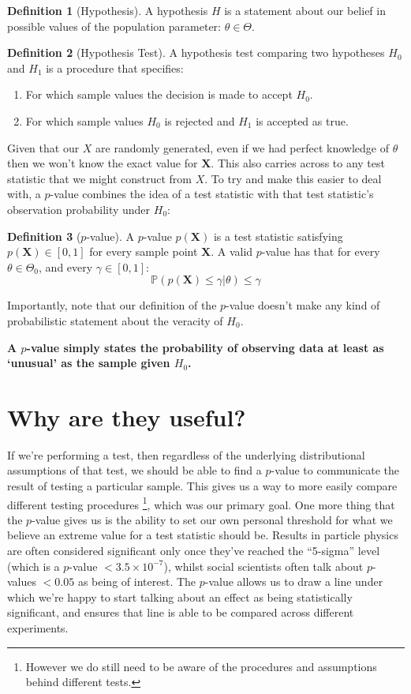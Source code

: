 \documentclass{tufte-handout}
\theoremstyle{plain}
\theoremstyle{definition}
\newtheorem{dfn}{Definition}
\newcommand{\XX}{\mathbf{X}}
\newcommand{\prb}[1]{\mathbb{P}\left( #1 \right)}
\begin{document}
\begin{dfn}[Hypothesis]
    A hypothesis $H$ is a statement about our belief in possible values of the population parameter: $\theta \in \Theta$.
\end{dfn}

\begin{dfn}[Hypothesis Test]
    A hypothesis test comparing two hypotheses $H_0$ and $H_1$ is a procedure that specifies:
    \begin{enumerate}
        \item For which sample values the decision is made to accept $H_0$.
        \item For which sample values $H_0$ is rejected and $H_1$ is accepted as true.
    \end{enumerate}
\end{dfn}

Given that our $X$ are randomly generated, even if we had perfect knowledge of $\theta$ then we won't know the exact value for $\mathbf{X}$.
This also carries across to any test statistic that we might construct from $X$.
To try and make this easier to deal with, a $p$-value combines the idea of a test statistic with that test statistic's observation probability under $H_0$:

\begin{dfn}[$p$-value]
    A $p$-value $p(\XX)$ is a test statistic satisfying $p(\XX) \in [0, 1]$ for every sample point $\XX$.
    A valid $p$-value has that for every $\theta \in \Theta_0$, and every $\gamma \in [0, 1]$:
    $$ \prb{p(\XX) \leq \gamma \vert \theta} \leq \gamma $$
\end{dfn}

Importantly, note that our definition of the $p$-value doesn't make any kind of probabilistic statement about the veracity of $H_0$.

\textbf{A $p$-value simply states the probability of observing data at least as `unusual' as the sample given $H_0$.}

\section{Why are they useful?}

If we're performing a test, then regardless of the underlying distributional assumptions of that test, we should be able to find a $p$-value to communicate the result of testing a particular sample.
This gives us a way to more easily compare different testing procedures \footnote{However we do still need to be aware of the procedures and assumptions behind different tests.}, which was our primary goal.
One more thing that the $p$-value gives us is the ability to set our own personal threshold for what we believe an extreme value for a test statistic should be.
Results in particle physics are often considered significant only once they've reached the ``5-sigma'' level (which is a $p$-value $< 3.5 \times 10 ^ {-7}$), whilst social scientists often talk about $p$-values $< 0.05$ as being of interest.
The $p$-value allows us to draw a line under which we're happy to start talking about an effect as being statistically significant, and ensures that line is able to be compared across different experiments.
\end{document}
